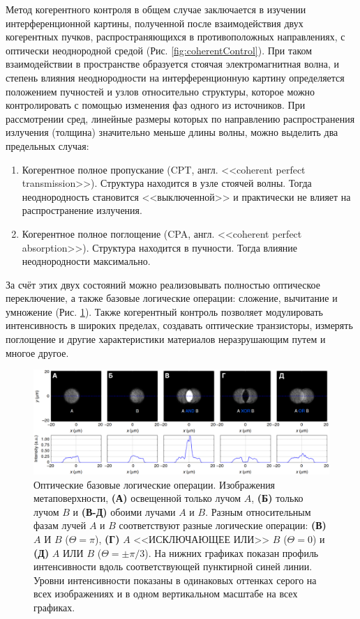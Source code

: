 Метод когерентного контроля в общем случае заключается в изучении интерференционной картины, полученной после взаимодействия двух когерентных пучков, распространяющихся в противоположных направлениях, с оптически неоднородной средой (Рис. \ref{fig:coherentControl}). При таком взаимодействии в пространстве образуется стоячая электромагнитная волна, и степень влияния неоднородности на интерференционную картину определяется положением пучностей и узлов относительно структуры, которое можно контролировать с помощью изменения фаз одного из источников. При рассмотрении сред, линейные размеры которых по направлению распространения излучения (толщина) значительно меньше длины волны, можно выделить два предельных случая\cite{lightWithLight2015}:
\begin{enumerate}
    \item Когерентное полное пропускание (CPT, англ. <<coherent perfect transmission>>). Структура находится в узле стоячей волны. Тогда неоднородность становится <<выключенной>> и практически не влияет на распространение излучения.
    \item Когерентное полное поглощение (CPA, англ. <<coherent perfect absorption>>). Структура находится в пучности. Тогда влияние неоднородности максимально.
\end{enumerate}
За счёт этих двух состояний можно реализовывать полностью оптическое переключение, а также базовые логические операции: сложение, вычитание и умножение (Рис. \ref{fig:opticalLogic}). Также когерентный контроль позволяет модулировать интенсивность в широких пределах\cite{lightWithLight2012}, создавать оптические транзисторы\cite{lightWithLight2015}, измерять поглощение и другие характеристики материалов неразрушающим путем\cite{CPAGraphene2017} и многое другое.

\begin{figure}
    \begin{center}
        \includegraphics[width=\textwidth]{pictures/Optical_logic.png}
        \caption{Оптические базовые логические операции. Изображения метаповерхности, \textbf{(А)} освещенной только лучом $A$, \textbf{(Б)} только лучом $B$ и \textbf{(В-Д)} обоими лучами $A$ и $B$. Разным относительным фазам лучей $A$ и $B$ соответствуют разные логические операции: \textbf{(В)} $A$ И $B$ ($\Theta = \pi$), \textbf{(Г)} $A$ <<ИСКЛЮЧАЮЩЕЕ ИЛИ>> $B$ ($\Theta = 0$) и \textbf{(Д)} $A$ ИЛИ $B$ ($\Theta = \pm \pi/3$). На нижних графиках показан профиль интенсивности вдоль соответствующей пунктирной синей линии. Уровни интенсивности показаны в одинаковых оттенках серого на всех изображениях и в одном вертикальном масштабе на всех графиках\cite{twoDimensional2016}.}
        \label{fig:opticalLogic}
    \end{center}
\end{figure}

